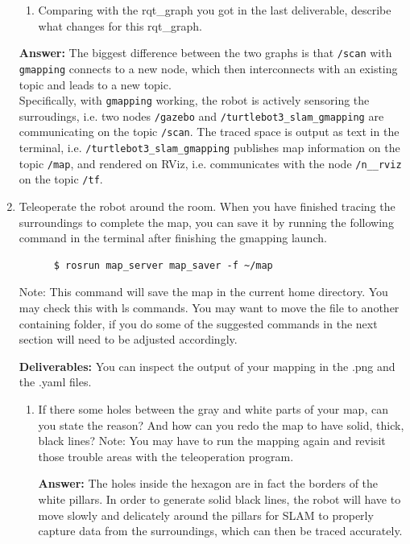 \documentclass[12pt]{article}
\begin{document}
\begin{enumerate}
\begin{enumerate}
    \item Comparing with the rqt\_graph you got in the last deliverable, describe what changes for this rqt\_graph.  
\end{enumerate}

    \textbf{Answer: }The biggest difference between the two graphs is that \texttt{/scan} with \texttt{gmapping} connects to a new node, which then interconnects with an existing topic and leads to a new topic.
    \\Specifically, with \texttt{gmapping} working, the robot is actively sensoring the surroudings, i.e. two nodes \texttt{/gazebo} and \texttt{/turtlebot3_slam_gmapping} are communicating on the topic \texttt{/scan}.
    The traced space is output as text in the terminal, i.e. \texttt{/turtlebot3_slam_gmapping} publishes map information on the topic \texttt{/map}, and rendered on RViz, i.e. communicates with the node \texttt{/n__rviz} on the topic \texttt{/tf}.

        
    \item Teleoperate the robot around the room. When you have finished tracing the surroundings to complete the map, you can save it by running the following command in the terminal after finishing the gmapping launch.
    \begin{verbatim}
      $ rosrun map_server map_saver -f ~/map
    \end{verbatim}
     Note: This command will save the map in the current home directory. You may check this with ls commands. You may want to move the file to another containing folder, if you do some of the suggested commands in the next section will need to be adjusted accordingly. 
     
   \textbf{Deliverables:}
   You can inspect the output of your mapping in the .png and the .yaml files.
    \begin{enumerate}
        \item If there some holes between the gray and white parts of your map, can you state the reason? And how can you redo the map to have solid, thick, black lines? Note: You may have to run the mapping again and revisit those trouble areas with the teleoperation program.
        
        \textbf{Answer: }The holes inside the hexagon are in fact the borders of the white pillars.
        In order to generate solid black lines, the robot will have to move slowly and delicately around the pillars for SLAM to properly capture data from the surroundings, which can then be traced accurately.


\end{enumerate}
\end{enumerate}
\end{document}
